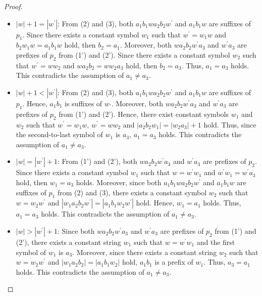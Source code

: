 \begin{proof}
\begin{itemize}
\item $|w|+1=|w^{\prime}|$: From (2) and (3), {\color{red}both }$a_{1}b_{1}wa_{2}b_{2}w^{\prime}$ and $a_{1}b_{1}w$ are suffixes of $p_{1}$.
Since there exists a constant symbol $w_{1}$ such that $w^{\prime}=w_{1}w$ and $b_{2}w_{1}w=a_{1}b_{1}w$ hold,
then $b_{2}=a_{1}$.
Moreover, {\color{red}both }$wa_{2}b_{2}w^{\prime}a_{3}$ and $w^{\prime}a_{3}$ are prefixes of $p_{2}$ from (1') and (2').
Since there exists a constant symbol $w_{2}$ such that $w^{\prime}=ww_{2}$ and $wa_{2}b_{2}=ww_{2}a_{3}$ hold,
then $b_{2}=a_{3}$.
Thus, $a_{1} = a_{3}$ holds.
This contradicts the assumption of $a_{1} \ne a_{3}$.
%
\item $|w|+1 < |w^{\prime}|$: From (2) and (3), {\color{red}both }$a_{1}b_{1}wa_{2}b_{2}w^{\prime}$ and $a_{1}b_{1}w$ are suffixes of $p_{1}$.
Hence, $a_{1}b_{1}$ is suffixes of $w_{\prime}$.
Moreover, {\color{red}both }$wa_{2}b_{2}w^{\prime}a_{3}$ and $w^{\prime}a_{3}$ are prefixes of $p_{2}$ from (1') and (2').
Hence, there exist constant symbols $w_{1}$ and $w_{2}$ such that $w^{\prime}=w_{1}w$, $w^{\prime}=ww_{2}$ and $|a_{2}b_{2}w_{1}|=|w_{2}a_{3}|+1$ hold.
Thus, since the second-to-last symbol of $w_{1}$ is $a_{3}$, $a_{1}=a_{3}$ holds.
This contradicts the assumption of $a_{1} \ne a_{3}$.
%
\item $|w|=|w^{\prime}|+1$: From (1') and (2'), {\color{red}both }$wa_{2}b_{2}w^{\prime}a_{3}$ and $w^{\prime}a_{3}$ are prefixes of $p_{2}$.
Since there exists a constant symbol $w_{1}$ such that $w=w^{\prime}w_{1}$ and $w^{\prime}w_{1}=w^{\prime}a_{3}$ hold, then $w_{1}=a_{3}$ holds.
Moreover, since {\color{red}both }$a_{1}b_{1}wa_{2}b_{2}w^{\prime}$ and $a_{1}b_{1}w$ are suffixes of $p_{1}$ from (2) and (3), 
there exists a constant symbol $w_{2}$ such that $w=w_{2}w^{\prime}$ and $|w_{1}a_{2}b_{2}w^{\prime}|=|a_{1}b_{1}w_{2}w^{\prime}|$ hold.
Hence, $w_{1}=a_{1}$ holds.
Thus, $a_{1}=a_{3}$ holds.
This contradicts the assumption of $a_{1}\ne a_{3}$.
%
\item $|w| > |w^{\prime}|+1$: Since {\color{red}both }$wa_{2}b_{2}w^{\prime}a_{3}$ and $w^{\prime}a_{3}$ are prefixes of $p_{2}$ from (1') and (2'),
there exists a constant string $w_{1}$ such that $w=w^{\prime}w_{1}$ and the first symbol of $w_{1}$ is $a_{3}$.
Moreover, since there exists a constant string $w_{2}$ such that $w=w_{2}w^{\prime}$ and $|w_{1}a_{2}b_{2}|=|a_{1}b_{1}w_{2}|$ hold,
$a_{1}b_{1}$ is a prefix of $w_{1}$.
Thus, $a_{3}=a_{1}$ holds.
This contradicts the assumption of $a_{1} \ne a_{3}$.
\end{itemize}


\end{proof}
